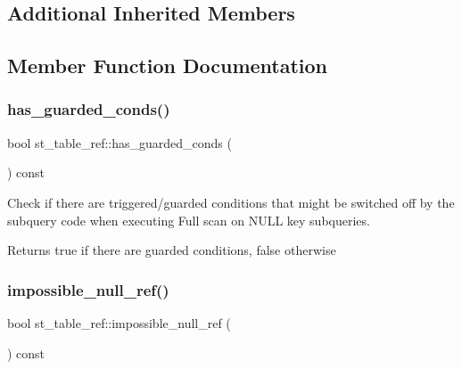 \subsection*{Additional Inherited Members}


\subsection{Member Function Documentation}
\mbox{\label{structst__table__ref_a19dc04ec0d9bf489736d803dd15945f0}} 
\subsubsection{\texorpdfstring{has\+\_\+guarded\+\_\+conds()}{has\_guarded\_conds()}}
{\footnotesize\ttfamily bool st\+\_\+table\+\_\+ref\+::has\+\_\+guarded\+\_\+conds (\begin{DoxyParamCaption}{ }\end{DoxyParamCaption}) const\hspace{0.3cm}{\ttfamily [inline]}}

Check if there are triggered/guarded conditions that might be \textquotesingle{}switched off\textquotesingle{} by the subquery code when executing \textquotesingle{}Full scan on N\+U\+LL key\textquotesingle{} subqueries.

\begin{DoxyReturn}{Returns}
true if there are guarded conditions, false otherwise 
\end{DoxyReturn}
\mbox{\label{structst__table__ref_ad15491c9abe01eed929d9afb0b077607}} 
\subsubsection{\texorpdfstring{impossible\+\_\+null\+\_\+ref()}{impossible\_null\_ref()}}
{\footnotesize\ttfamily bool st\+\_\+table\+\_\+ref\+::impossible\+\_\+null\+\_\+ref (\begin{DoxyParamCaption}{ }\end{DoxyParamCaption}) const\hspace{0.3cm}{\ttfamily [inline]}}

